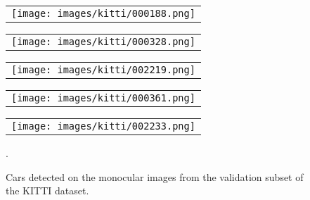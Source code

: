 \documentclass[10pt,twocolumn,letterpaper]{article}
\begin{document}
\begin{figure*}[!ht]
\centering
\setlength{\tabcolsep}{2pt}
\renewcommand{\arraystretch}{0.75}
\begin{tabular}{c}
    \texttt{[image: images/kitti/000188.png]}
\end{tabular}
\begin{tabular}{c}
    \texttt{[image: images/kitti/000328.png]}
\end{tabular}
\begin{tabular}{c}
    \texttt{[image: images/kitti/002219.png]}
\end{tabular}
\begin{tabular}{c}
    \texttt{[image: images/kitti/000361.png]}
\end{tabular}
\begin{tabular}{c}
    \texttt{[image: images/kitti/002233.png]}
\end{tabular}
\caption{Cars detected on the monocular images from the validation subset of the KITTI dataset.}.
\label{fig:vis_kitti}
\end{figure*}
\end{document}
